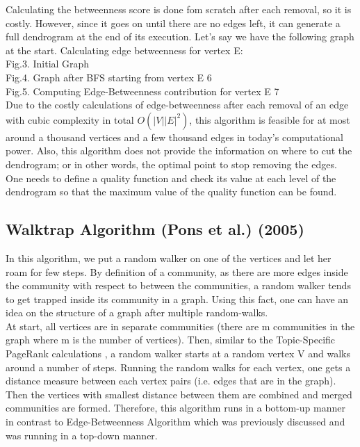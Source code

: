 \documentclass[10pt]{article}
\begin{document}
Calculating the betweenness score is done fom scratch after each removal, so it is costly. However, since it goes on until there are no edges left, it can generate a full dendrogram at the end of its execution. Let’s say we have the following graph at the start. Calculating edge betweenness for vertex E: \\

Fig.3. Initial Graph \\

Fig.4. Graph after BFS starting from vertex E 6 \\

Fig.5. Computing Edge-Betweenness contribution for vertex E 7 \\

Due to the costly calculations of edge-betweenness after each removal of an edge with cubic complexity in total $O\left(|V||E|^2 \right)$, this algorithm is feasible for at most around a thousand vertices and a few thousand edges in today’s computational power. Also, this algorithm does not provide the information on where to cut the dendrogram; or in other words, the optimal point to stop removing the edges. One needs to define a quality function and check its value at each level of the dendrogram so that the maximum value of the quality function can be found. \\

\subsection{Walktrap Algorithm (Pons et al.) (2005)}

In this algorithm, we put a random walker on one of the vertices and let her roam for few steps. By definition of a community, as there are more edges inside the community with respect to between the communities, a random walker tends to get trapped inside its community in a graph. Using this fact, one can have an idea on the structure of a graph after multiple random-walks. \\

At start, all vertices are in separate communities (there are m communities in the graph where m is the number of vertices). Then, similar to the Topic-Specific PageRank calculations \cite{mmds}, a random walker starts at a random vertex V and walks around a number of steps. Running the random walks for each vertex, one gets a distance measure between each vertex pairs (i.e. edges that are in the graph)\cite{random}. Then the vertices with smallest distance between them are combined and merged communities are formed. Therefore, this algorithm runs in a bottom-up manner in contrast to Edge-Betweenness Algorithm which was previously discussed and was running in a top-down manner. \\
\end{document}
